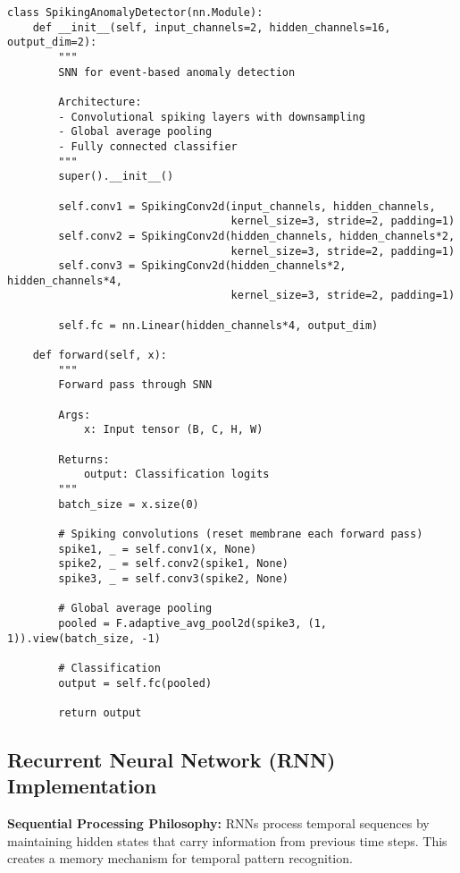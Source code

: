 \documentclass[12pt,a4paper]{article}
\begin{document}
\begin{lstlisting}[caption={SNN Anomaly Detector - Complete Bio-Inspired Architecture}]
class SpikingAnomalyDetector(nn.Module):
    def __init__(self, input_channels=2, hidden_channels=16, output_dim=2):
        """
        SNN for event-based anomaly detection
        
        Architecture:
        - Convolutional spiking layers with downsampling
        - Global average pooling
        - Fully connected classifier
        """
        super().__init__()
        
        self.conv1 = SpikingConv2d(input_channels, hidden_channels, 
                                   kernel_size=3, stride=2, padding=1)
        self.conv2 = SpikingConv2d(hidden_channels, hidden_channels*2, 
                                   kernel_size=3, stride=2, padding=1)
        self.conv3 = SpikingConv2d(hidden_channels*2, hidden_channels*4, 
                                   kernel_size=3, stride=2, padding=1)
        
        self.fc = nn.Linear(hidden_channels*4, output_dim)
    
    def forward(self, x):
        """
        Forward pass through SNN
        
        Args:
            x: Input tensor (B, C, H, W)
        
        Returns:
            output: Classification logits
        """
        batch_size = x.size(0)
        
        # Spiking convolutions (reset membrane each forward pass)
        spike1, _ = self.conv1(x, None)
        spike2, _ = self.conv2(spike1, None)
        spike3, _ = self.conv3(spike2, None)
        
        # Global average pooling
        pooled = F.adaptive_avg_pool2d(spike3, (1, 1)).view(batch_size, -1)
        
        # Classification
        output = self.fc(pooled)
        
        return output
\end{lstlisting}

\subsection{Recurrent Neural Network (RNN) Implementation}

\textbf{Sequential Processing Philosophy:} RNNs process temporal sequences by maintaining hidden states that carry information from previous time steps. This creates a memory mechanism for temporal pattern recognition.
\end{document}
